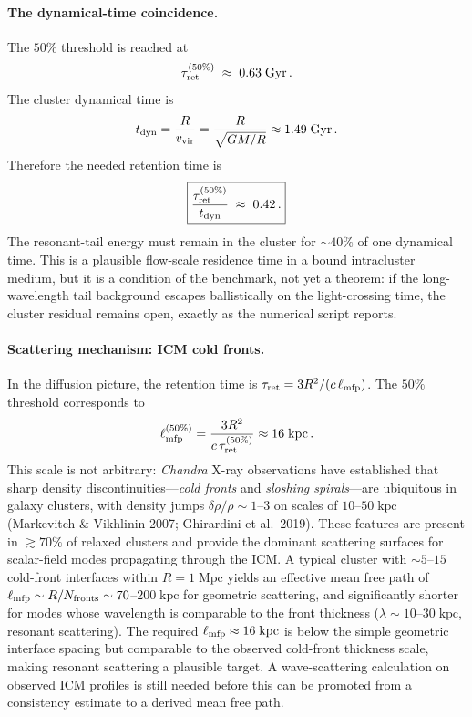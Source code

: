 \documentclass[11pt]{article}
\begin{document}
\paragraph{The dynamical-time coincidence.}
The $50\%$ threshold is reached at
\begin{equation}\label{eq:tau_ret_threshold}
\tau_{\rm ret}^{(50\%)} \;\approx\; 0.63\;\mathrm{Gyr}\,.
\end{equation}
The cluster dynamical time is
\begin{equation}\label{eq:t_dyn}
t_{\rm dyn}
= \frac{R}{v_{\rm vir}}
= \frac{R}{\sqrt{GM/R}}
\approx 1.49\;\mathrm{Gyr}\,.
\end{equation}
Therefore the needed retention time is
\begin{equation}\label{eq:tau_ratio}
\boxed{\frac{\tau_{\rm ret}^{(50\%)}}{t_{\rm dyn}}
\;\approx\; 0.42\,.}
\end{equation}
The resonant-tail energy must remain in the cluster for
$\sim\!40\%$ of one dynamical time.  This is a plausible
flow-scale residence time in a bound intracluster medium, but it is a
condition of the benchmark, not yet a theorem: if the long-wavelength
tail background escapes ballistically on the light-crossing time, the
cluster residual remains open, exactly as the numerical script reports.

\paragraph{Scattering mechanism: ICM cold fronts.}
In the diffusion picture, the retention time is
$\tau_{\rm ret}=3R^2/(c\,\ell_{\rm mfp})$.  The $50\%$
threshold corresponds to
\begin{equation}\label{eq:ell_mfp_critical}
\ell_{\rm mfp}^{(50\%)}
= \frac{3R^2}{c\,\tau_{\rm ret}^{(50\%)}}
\approx 16\;\mathrm{kpc}\,.
\end{equation}
This scale is not arbitrary: \textit{Chandra} X-ray observations
have established that sharp density discontinuities---\emph{cold
fronts} and \emph{sloshing spirals}---are ubiquitous in galaxy
clusters, with density jumps $\delta\rho/\rho\sim1$--$3$ on
scales of $10$--$50\;\mathrm{kpc}$
(Markevitch \& Vikhlinin 2007; Ghirardini et al.\ 2019).
These features are present in $\gtrsim\!70\%$ of relaxed
clusters and provide the dominant scattering surfaces for
scalar-field modes propagating through the ICM.  A typical
cluster with $\sim\!5$--$15$ cold-front interfaces within
$R=1\;\mathrm{Mpc}$ yields an effective mean free path of
$\ell_{\rm mfp}\sim R/N_{\rm fronts}\sim 70$--$200\;\mathrm{kpc}$
for geometric scattering, and significantly shorter for modes
whose wavelength is comparable to the front thickness
($\lambda\sim10$--$30\;\mathrm{kpc}$, resonant scattering).
The required $\ell_{\rm mfp}\approx16\;\mathrm{kpc}$ is below the
simple geometric interface spacing but comparable to the observed
cold-front thickness scale, making resonant scattering a plausible
target.  A wave-scattering calculation on observed ICM profiles is
still needed before this can be promoted from a consistency estimate to
a derived mean free path.
\end{document}
